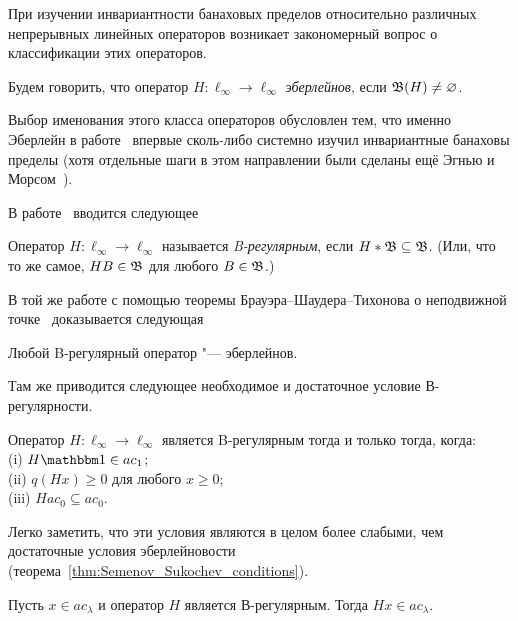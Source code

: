 При изучении инвариантности банаховых пределов относительно различных непрерывных линейных операторов
возникает закономерный вопрос о классификации этих операторов.

\begin{definition}
	Будем говорить, что оператор $H : \ell_\infty \to \ell_\infty$ \emph{эберлейнов},
	если $\mathfrak{B} (H) \ne \varnothing$.
\end{definition}

Выбор именования этого класса операторов обусловлен тем, что именно Эберлейн в работе~\cite{Eberlein}
впервые сколь-либо системно изучил инвариантные банаховы пределы
(хотя отдельные шаги в этом направлении были сделаны ещё Эгнью и Морсом~\cite{agnew1938linear,agnew1938extensions}).

В работе~\cite{alekhno2018invariant} вводится следующее

\begin{definition}
	\label{def:B-regular_operator}
	Оператор $H : \ell_\infty \to \ell_\infty$ называется \emph{B-регулярным},
	если $H*\mathfrak{B} \subseteq \mathfrak{B}$.
	(Или, что то же самое, $HB\in\mathfrak{B}$ для любого $B\in\mathfrak{B}$.)
\end{definition}

В той же работе с помощью теоремы Брауэра--Шаудера--Тихонова о неподвижной точке~\cite[Corollary  17.56]{aliprantis2006infinite}
доказывается следующая
\begin{theorem}
	\label{thm:B-regular_is_Eberlein}
	Любой B-регулярный оператор "--- эберлейнов.
\end{theorem}
Там же приводится следующее необходимое и достаточное условие В-регулярности.

\begin{theorem}
	\label{thm:crit_B_regularity}
	Оператор $H:\ell_\infty \to \ell_\infty$ является B-регулярным тогда и только тогда, когда:
	\\(i) $H\one \in ac_1$;
	\\(ii) $q(Hx)\geq 0$ для любого $x\geq 0$;
	\\(iii) $H ac_0 \subseteq ac_0$.
\end{theorem}
Легко заметить, что эти условия являются в целом более слабыми, чем достаточные условия эберлейновости
(теорема~\ref{thm:Semenov_Sukochev_conditions}).

\begin{corollary}
	Пусть $x\in ac_\lambda$ и оператор $H$ является В-регулярным.
	Тогда $Hx \in ac_\lambda$.
\end{corollary}


